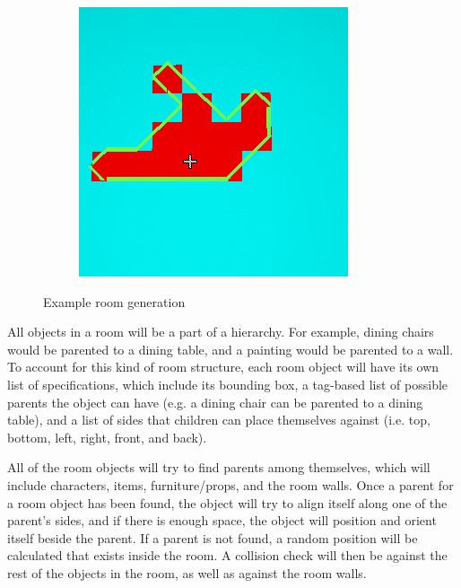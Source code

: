 \begin{figure}[htb]
\begin{subfigure}{.24\textwidth}
  \end{subfigure}%
  \begin{subfigure}{.24\textwidth}
    \centering
    \includegraphics[width=.9\linewidth]{images/maps3}
  \end{subfigure}%
  \caption{Example room generation}
  \label{fig:room_generation_example}
\end{figure}

All objects in a room will be a part of a hierarchy. For example, dining chairs would be parented to a dining table, and a painting would be parented to a wall. To account for this kind of room structure, each room object will have its own list of specifications, which include its bounding box, a tag-based list of possible parents the object can have (e.g. a dining chair can be parented to a dining table), and a list of sides that children can place themselves against (i.e. top, bottom, left, right, front, and back).

 All of the room objects will try to find parents among themselves, which will include characters, items, furniture/props, and the room walls. Once a parent for a room object has been found, the object will try to align itself along one of the parent's sides, and if there is enough space, the object will position and orient itself beside the parent. If a parent is not found, a random position will be calculated that exists inside the room. A collision check will then be against the rest of the objects in the room, as well as against the room walls.

